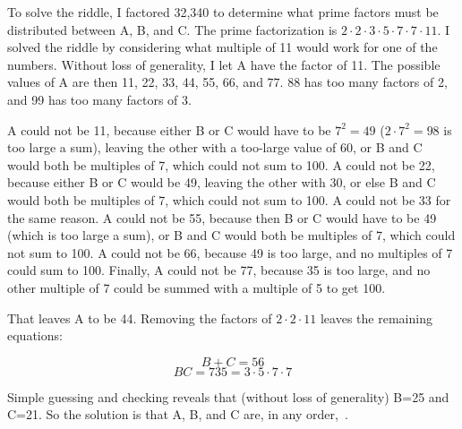 \documentclass{article}
\begin{document}
To solve the riddle, I factored 32,340 to determine what prime factors must be distributed between A, B, and C.
The prime factorization is $2\cdot2\cdot3\cdot5\cdot7\cdot7\cdot11$.
I solved the riddle by considering what multiple of 11 would work for one of the numbers.
Without loss of generality, I let A have the factor of 11.
The possible values of A are then 11, 22, 33, 44, 55, 66, and 77.
88 has too many factors of 2, and 99 has too many factors of 3.

A could not be 11, because either B or C would have to be $7^{2}=49$ ($2\cdot7^{2}=98$ is too large a sum), leaving the other with a too-large value of 60, or B and C would both be multiples of 7, which could not sum to 100.
A could not be 22, because either B or C would be 49, leaving the other with 30, or else B and C would both be multiples of 7, which could not sum to 100.
A could not be 33 for the same reason.
A could not be 55, because then B or C would have to be 49 (which is too large a sum), or
B and C would both be multiples of 7, which could not sum to 100.
A could not be 66, because 49 is too large, and no multiples of 7 could sum to 100.
Finally, A could not be 77, because 35 is too large, and no other multiple of 7 could be summed with a multiple of 5 to get 100.

That leaves A to be 44.
Removing the factors of $2\cdot2\cdot11$ leaves the remaining equations:

\[
B+C=56
\]
\[
BC=735=3\cdot5\cdot7\cdot7
\]

Simple guessing and checking reveals that (without loss of generality) B=25 and C=21.
So the solution is that A, B, and C are, in any order,
\,.
\end{document}

